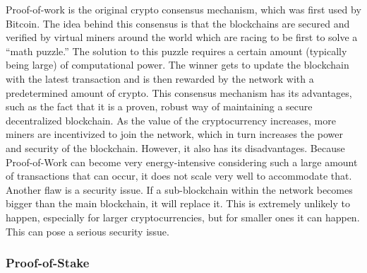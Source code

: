 Proof-of-work is the original crypto consensus mechanism, which was first used by Bitcoin. The idea behind this consensus is that the blockchains are secured and verified by virtual miners around the world which are racing to be first to solve a “math puzzle.” The solution to this puzzle requires a certain amount (typically being large) of computational power. The winner gets to update the blockchain with the latest transaction and is then rewarded by the network with a predetermined amount of crypto. This consensus mechanism has its advantages, such as the fact that it is a proven, robust way of maintaining a secure decentralized blockchain. As the value of the cryptocurrency increases, more miners are incentivized to join the network, which in turn increases the power and security of the blockchain. However, it also has its disadvantages. Because Proof-of-Work can become very energy-intensive considering such a large amount of transactions that can occur, it does not scale very well to accommodate that. Another flaw is a security issue. If a sub-blockchain within the network becomes bigger than the main blockchain, it will replace it. This is extremely unlikely to happen, especially for larger cryptocurrencies, but for smaller ones it can happen. This can pose a serious security issue.

\subsubsection{Proof-of-Stake}

